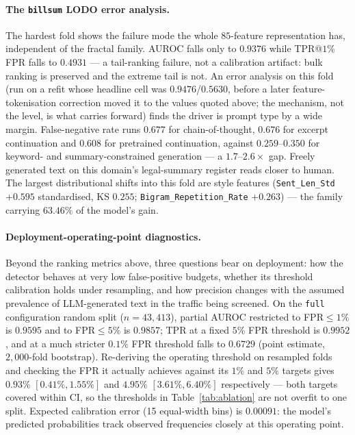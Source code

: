 \documentclass{article}
\newcommand{\arm}[1]{\texttt{#1}}
\begin{document}
\paragraph{The \texttt{billsum} LODO error analysis.} The hardest fold shows the
failure mode the whole $85$-feature representation has, independent of the
fractal family. AUROC falls only to $0.9376$ while TPR@$1\%$FPR falls to
$0.4931$ --- a tail-ranking failure, not a calibration artifact: bulk ranking is
preserved and the extreme tail is not. An error analysis on this fold (run on a
refit whose headline cell was $0.9476$/$0.5630$, before a later
feature-tokenisation correction moved it to the values quoted above; the
mechanism, not the level, is what carries forward)
finds the driver is prompt type by a wide margin. False-negative rate runs
$0.677$ for chain-of-thought, $0.676$ for excerpt continuation and $0.608$ for
pretrained continuation, against $0.259$--$0.350$ for keyword- and
summary-constrained generation --- a $1.7$--$2.6\times$ gap. Freely generated
text on this domain's legal-summary register reads closer to human. The largest
distributional shifts into this fold are style features
(\texttt{Sent\_Len\_Std} $+0.595$ standardised, KS $0.255$;
\texttt{Bigram\_Repetition\_Rate} $+0.263$) --- the family carrying $63.46\%$ of
the model's gain.

\paragraph{Deployment-operating-point diagnostics.} Beyond the ranking metrics
above, three questions bear on deployment: how the detector behaves at very
low false-positive budgets, whether its threshold calibration holds under
resampling, and how precision changes with the assumed prevalence of
LLM-generated text in the traffic being screened. On the \arm{full}
configuration random split ($n=43{,}413$), partial AUROC restricted to
FPR$\le1\%$ is $0.9595$ and to FPR$\le5\%$ is $0.9857$; TPR at a fixed $5\%$
FPR threshold is $0.9952$, and at a much stricter $0.1\%$ FPR threshold falls
to $0.6729$ (point estimate, $2{,}000$-fold bootstrap). Re-deriving the
operating threshold on resampled folds and checking the FPR it actually
achieves against its $1\%$ and $5\%$ targets gives $0.93\%$ $[0.41\%,1.55\%]$
and $4.95\%$ $[3.61\%,6.40\%]$ respectively --- both targets covered within
CI, so the thresholds in Table~\ref{tab:ablation} are not overfit to one
split. Expected calibration error (15 equal-width bins) is $0.00091$: the
model's predicted probabilities track observed frequencies closely at this
operating point.
\end{document}
